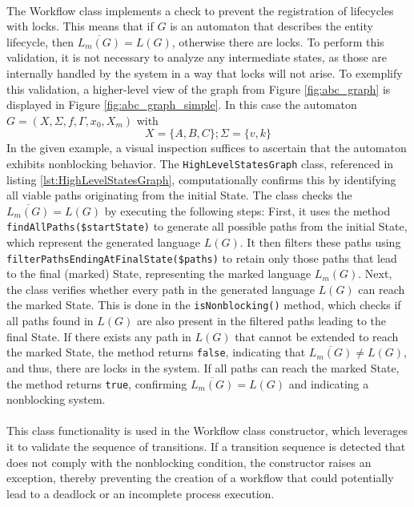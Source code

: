 
\paragraph{} The Workflow class implements a check to prevent the registration of lifecycles with locks. This means that if $G$ is an automaton that describes the entity lifecycle, then $\overline{L_m(G)}=L(G)$, otherwise there are locks. To perform this validation, it is not necessary to analyze any intermediate states, as those are internally handled by the system in a way that locks will not arise. To exemplify this validation, a higher-level view of the graph from Figure \ref{fig:abc_graph} is displayed in Figure \ref{fig:abc_graph_simple}. In this case the automaton $ G=(X, \Sigma, f, \Gamma, x_0, X_m)$ with
$$
X=\{A, B, C\}; \Sigma=\{v, k\}
$$
\noindent
In the given example, a visual inspection suffices to ascertain that the automaton exhibits nonblocking behavior. The \verb|HighLevelStatesGraph| class, referenced in listing \ref{lst:HighLevelStatesGraph}, computationally confirms this by identifying all viable paths originating from the initial State. The class checks the  \(\overline{L_m(G)}=L(G)\) by executing the following steps: First, it uses the method \verb|findAllPaths($startState)| to generate all possible paths from the initial State, which represent the generated language \(L(G)\). It then filters these paths using \verb|filterPathsEndingAtFinalState($paths)| to retain only those paths that lead to the final (marked) State, representing the marked language \(L_m(G)\). Next, the class verifies whether every path in the generated language \(L(G)\) can reach the marked State. This is done in the \verb|isNonblocking()| method, which checks if all paths found in \(L(G)\) are also present in the filtered paths leading to the final State. If there exists any path in \(L(G)\) that cannot be extended to reach the marked State, the method returns \verb|false|, indicating that \(\overline{L_m(G)} \neq L(G)\), and thus, there are locks in the system. If all paths can reach the marked State, the method returns \verb|true|, confirming \(\overline{L_m(G)} = L(G)\) and indicating a nonblocking system.



\paragraph{} This class functionality is used in the Workflow class constructor, which leverages it to validate the sequence of transitions. If a transition sequence is detected that does not comply with the nonblocking condition, the constructor raises an exception, thereby preventing the creation of a workflow that could potentially lead to a deadlock or an incomplete process execution.

